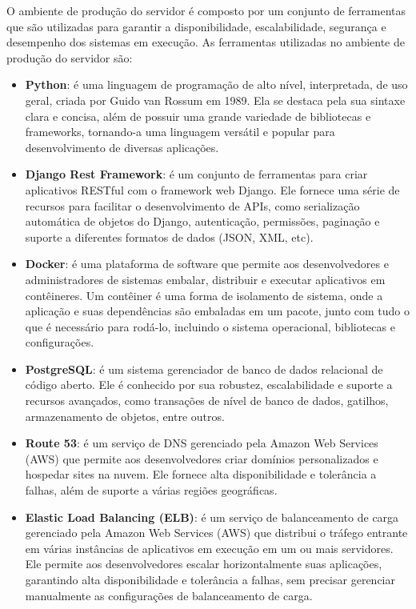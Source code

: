 O ambiente de produção do servidor é composto por um conjunto de ferramentas que são utilizadas para garantir a disponibilidade, escalabilidade, segurança e desempenho dos sistemas em execução. As ferramentas utilizadas no ambiente de produção do servidor são:

\begin{itemize} \label{itemize:server_production}
    \item \textbf{Python}: é uma linguagem de programação de alto nível, interpretada, de uso geral, criada por Guido van Rossum em 1989. Ela se destaca pela sua sintaxe clara e concisa, além de possuir uma grande variedade de bibliotecas e frameworks, tornando-a uma linguagem versátil e popular para desenvolvimento de diversas aplicações.
    \item \textbf{Django Rest Framework}: é um conjunto de ferramentas para criar aplicativos RESTful com o framework web Django. Ele fornece uma série de recursos para facilitar o desenvolvimento de APIs, como serialização automática de objetos do Django, autenticação, permissões, paginação e suporte a diferentes formatos de dados (JSON, XML, etc).
    \item \textbf{Docker}: é uma plataforma de software que permite aos desenvolvedores e administradores de sistemas embalar, distribuir e executar aplicativos em contêineres. Um contêiner é uma forma de isolamento de sistema, onde a aplicação e suas dependências são embaladas em um pacote, junto com tudo o que é necessário para rodá-lo, incluindo o sistema operacional, bibliotecas e configurações.
    \item \textbf{PostgreSQL}: é um sistema gerenciador de banco de dados relacional de código aberto. Ele é conhecido por sua robustez, escalabilidade e suporte a recursos avançados, como transações de nível de banco de dados, gatilhos, armazenamento de objetos, entre outros.
    \item \textbf{Route 53}: é um serviço de DNS gerenciado pela Amazon Web Services (AWS) que permite aos desenvolvedores criar domínios personalizados e hospedar sites na nuvem. Ele fornece alta disponibilidade e tolerância a falhas, além de suporte a várias regiões geográficas.
    \item \textbf{Elastic Load Balancing (ELB)}: é um serviço de balanceamento de carga gerenciado pela Amazon Web Services (AWS) que distribui o tráfego entrante em várias instâncias de aplicativos em execução em um ou mais servidores. Ele permite aos desenvolvedores escalar horizontalmente suas aplicações, garantindo alta disponibilidade e tolerância a falhas, sem precisar gerenciar manualmente as configurações de balanceamento de carga.

\end{itemize}
